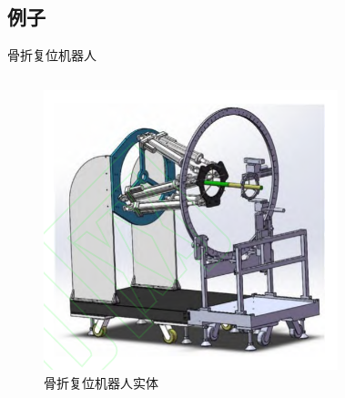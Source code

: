 \documentclass[notheorems, aspectratio=54]{beamer}
\begin{document}
\subsection{例子}
\begin{frame}{骨折复位机器人}
    \begin{columns}
    \begin{figure}[htbp]
		\centering
		\includegraphics[scale=0.4]{figure3.png}
		\caption{骨折复位机器人实体}
		\label{figure 3}
	\end{figure}
	\begin{figure}[htbp]
		\centering

\end{figure}
\end{columns}
\end{frame}
\end{document}
